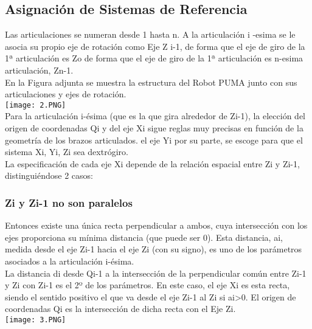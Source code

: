 \documentclass[12pt,a4paper]{article}
\begin{document}
\subsection{Asignación de Sistemas de Referencia}
Las articulaciones se numeran desde 1 hasta n. A la articulación i -esima se le asocia su propio eje de rotación como Eje Z i-1, de forma que el eje de giro de la 1ª articulación es Zo de forma que el eje de giro de la 1ª articulación es n-esima articulación, Zn-1.\\
En la Figura adjunta se muestra la estructura del Robot PUMA junto con sus articulaciones y ejes de rotación.\\
\texttt{[image: 2.PNG]} \\
Para la articulación i-ésima (que es la que gira alrededor de Zi-1), la elección del origen de coordenadas Qi y del eje Xi sigue reglas muy precisas en función de la geometría de los brazos articulados. el eje Yi por su parte, se escoge para que el sistema {Xi, Yi, Zi} sea dextrógiro. \\
La especificación de cada eje Xi depende de la relación espacial entre Zi y Zi-1, distinguiéndose 2 casos:\\
\subsubsection{Zi y Zi-1  no son paralelos}
Entonces existe una única recta perpendicular a ambos, cuya intersección con los ejes proporciona su mínima distancia (que puede ser 0). Esta distancia, ai,  medida desde el eje Zi-1 hacia el eje Zi (con su signo), es uno de los parámetros asociados a la articulación i-ésima.\\
La distancia di desde Qi-1 a la intersección de la perpendicular común entre Zi-1 y Zi con Zi-1 es el 2º de los parámetros. En este caso, el eje Xi es esta recta, siendo el sentido positivo el que va desde el eje Zi-1 al Zi si ai>0. El origen de coordenadas Qi es la intersección de dicha recta con el Eje Zi.\\
\texttt{[image: 3.PNG]} \\
\end{document}
